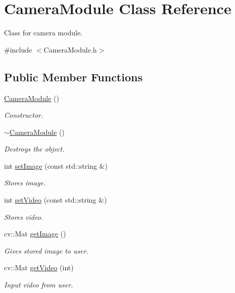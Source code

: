 \hypertarget{class_camera_module}{}\section{Camera\+Module Class Reference}
\label{class_camera_module}


Class for camera module.  




{\ttfamily \#include $<$Camera\+Module.\+h$>$}

\subsection*{Public Member Functions}
\begin{DoxyCompactItemize}
\item 
\mbox{\hyperlink{class_camera_module_aee54ebbc4116cf63c1e9a95987d779a0}{Camera\+Module}} ()
\begin{DoxyCompactList}\small\item\em Constructor. \end{DoxyCompactList}\item 
\mbox{\hyperlink{class_camera_module_a04bd90027432f057e9b12d1c601c8fcb}{$\sim$\+Camera\+Module}} ()
\begin{DoxyCompactList}\small\item\em Destroys the object. \end{DoxyCompactList}\item 
int \mbox{\hyperlink{class_camera_module_a8193de86e0feb9cefa323d633b5d3e35}{set\+Image}} (const std\+::string \&)
\begin{DoxyCompactList}\small\item\em Stores image. \end{DoxyCompactList}\item 
int \mbox{\hyperlink{class_camera_module_ae02f67a7856d9197fb27a769ed3767c5}{set\+Video}} (const std\+::string \&)
\begin{DoxyCompactList}\small\item\em Stores video. \end{DoxyCompactList}\item 
cv\+::\+Mat \mbox{\hyperlink{class_camera_module_a42b107b119e5e9aa18286bfb1f926d7a}{get\+Image}} ()
\begin{DoxyCompactList}\small\item\em Gives stored image to user. \end{DoxyCompactList}\item 
cv\+::\+Mat \mbox{\hyperlink{class_camera_module_ab4375cbacea80f50261c18fb4c7804d4}{get\+Video}} (int)
\begin{DoxyCompactList}\small\item\em Input video from user. \end{DoxyCompactList}\end{DoxyCompactItemize}


